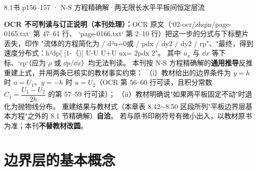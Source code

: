\begin{liti}{8.1}{书 p156--157 · N-S 方程精确解·两无限长水平平板间恒定层流}
\begin{tishi}
\textbf{OCR 不可判读与订正说明（本刊处理）：}OCR 原文（`02-ocr/zhqin/page-0165.txt` 第 47--61 行、
`page-0166.txt` 第 2--10 行）把这一步的分式与下标整片丢失，印作
"流体的方程简化为 / d²u=0或 / pdx / dy2 / dy2 / rp"、"最终，得到速度分布式：h²dp[ [1-（)] U-U U+U ux= 2pdx 2"。
其中 $u_x$ 与 $\dd x$ 等下标、`rp`（应为 $\rho$ 或 $\dd p/\dd x$）均无法判读。
本刊按 N-S 方程精确解的\textbf{通用推导}反推重建上式，并用两条已核实的教材事实约束：
（i）教材给出的边界条件为 $y=h$ 时 $u=U_1$、$y=-h$ 时 $u=U_2$（OCR 第 56--60 行可读，且积分常数
$C_1=\dfrac{U_1-U_2}{2h}$ 的第 57--59 行可读）；
（ii）教材明确说"如果两平板固定不动"时退化为抛物线分布。
重建结果与教材式（本章表 8.42$\sim$8.50 区段所列"平板边界层基本方程"之外的 8.1 节精确解）\textbf{自洽}。
若与原书印刷符号有微小出入，以教材原书为准；本刊\textbf{不替教材改圆}。
\end{tishi}
\end{liti}

\section{边界层的基本概念}

